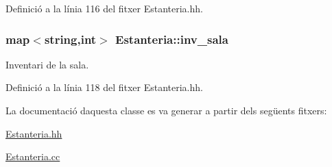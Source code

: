 Definició a la línia 116 del fitxer Estanteria.\+hh.

\subsubsection[{\texorpdfstring{inv\+\_\+sala}{inv_sala}}]{\setlength{\rightskip}{0pt plus 5cm}map$<$string,int$>$ Estanteria\+::inv\+\_\+sala\hspace{0.3cm}{\ttfamily [private]}}\hypertarget{class_estanteria_af37488895058b4673e3d093a84df4c63}{}\label{class_estanteria_af37488895058b4673e3d093a84df4c63}


Inventari de la sala. 



Definició a la línia 118 del fitxer Estanteria.\+hh.



La documentació d\textquotesingle{}aquesta classe es va generar a partir dels següents fitxers\+:\begin{DoxyCompactItemize}
\item 
\hyperlink{_estanteria_8hh}{Estanteria.\+hh}\item 
\hyperlink{_estanteria_8cc}{Estanteria.\+cc}\end{DoxyCompactItemize}
